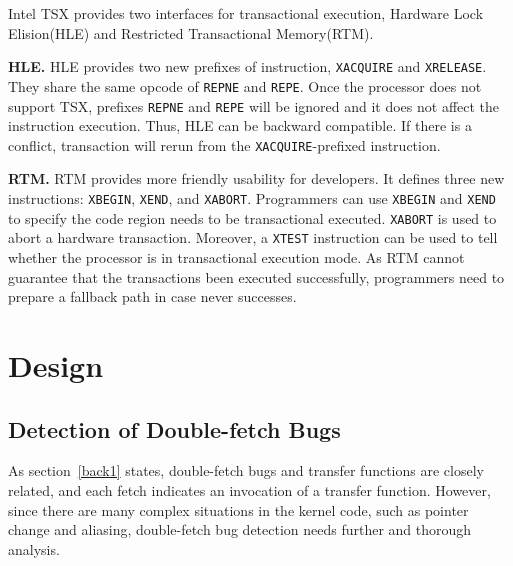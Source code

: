 \documentclass[10pt]{llncs}
\begin{document}
Intel TSX provides two interfaces for transactional execution, Hardware Lock Elision(HLE) and Restricted Transactional Memory(RTM).

\textbf{HLE.} HLE provides two new prefixes of instruction, \verb:XACQUIRE: and \verb:XRELEASE:. They share the same opcode of \verb:REPNE: and \verb:REPE:. Once the processor does not support TSX, prefixes \verb:REPNE: and \verb:REPE: will be ignored and it does not affect the instruction execution. Thus, HLE can be backward compatible. If there is a conflict, transaction will rerun from the \verb:XACQUIRE:-prefixed instruction.

\textbf{RTM.} RTM provides more friendly usability for developers. It defines three new instructions: \verb:XBEGIN:, \verb:XEND:, and \verb:XABORT:. Programmers can use \verb:XBEGIN: and \verb:XEND: to specify the code region needs to be transactional executed. \verb:XABORT: is used to abort a hardware transaction. Moreover, a \verb:XTEST: instruction can be used to tell whether the processor is in transactional execution mode. As RTM cannot guarantee that the transactions been executed successfully, programmers need to prepare a fallback path in case never successes.

\section{Design}%
\label{design}

\subsection{Detection of Double-fetch Bugs}
\label{design1}
As section~\ref{back1} states, double-fetch bugs and transfer functions are closely related, 
and each fetch indicates an invocation of a transfer function. However, since there are many 
complex situations in the kernel code, such as pointer change and aliasing, double-fetch bug 
detection needs further and thorough analysis.


\end{document}
